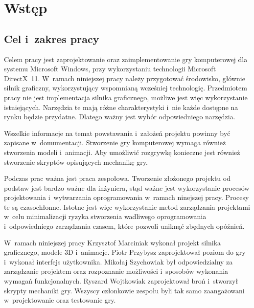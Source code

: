 
\chapter{Wst\k{e}p}

\section{Cel i~zakres pracy}

Celem pracy jest zaprojektowanie oraz zaimplementowanie gry komputerowej dla systemu Microsoft Windows, przy wykorzystaniu technologii Microsoft DirectX~11. W~ramach niniejszej pracy należy przygotować środowisko, głównie silnik graficzny, wykorzystujący wspomnianą wcześniej technologię. Przedmiotem pracy nie jest implementacja silnika graficznego, możliwe jest więc wykorzystanie istniejących. Narzędzia te mają różne charakterystyki i~nie każde dostępne na rynku będzie przydatne. Dlatego ważny jest wybór odpowiedniego narzędzia. 

Wszelkie informacje na temat  powstawania i~założeń projektu powinny być zapisane w~domumentacji. Stworzenie gry komputerowej wymaga również stworzenia modeli i~animacji. Aby umożliwić rozgrywkę konieczne jest również stworzenie skryptów opisujących mechanikę gry.  

Podczas prac ważna jest praca zespołowa. Tworzenie złożonego projektu od podstaw jest bardzo ważne dla inżyniera, stąd ważne jest wykorzystanie procesów projektowania i~wytwarzania oprogramowania w~ramach ninejszej pracy. Procesy te są czasochłonne. Istotne jest więc wykorzystanie metod zarządzania projektami w~celu minimalizacji ryzyka stworzenia wadliwego oprogramowania i~odpowiedniego zarządzania czasem, które pozwoli uniknąć zbędnych opóźnień. 

W~ramach niniejszej pracy Krzysztof Marciniak wykonał projekt silnika graficznego, modele 3D i~animacje. 
Piotr Przybysz zaprojektował poziom do gry i~wykonał interfejs użytkownika. 
Mikołaj Szychowiak był odpowiedzialny za zarządzanie projektem oraz rozpoznanie możliwości i~sposobów wykonania wymagań funkcjonalnych.
Ryszard Wojtkowiak zaprojektował broń i~stworzył skrypty mechaniki gry.
Wszyscy członkowie zespołu byli tak samo zaangażowani w~projektowanie oraz testowanie gry.